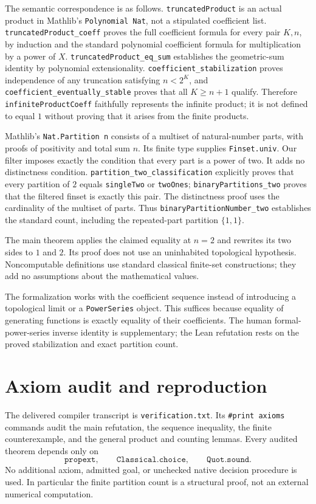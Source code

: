 \documentclass[11pt]{article}
\begin{document}
The semantic correspondence is as follows. \texttt{truncatedProduct} is an actual product in Mathlib's \texttt{Polynomial Nat}, not a stipulated coefficient list. \texttt{truncatedProduct\_coeff} proves the full coefficient formula for every pair $K,n$, by induction and the standard polynomial coefficient formula for multiplication by a power of $X$. \texttt{truncatedProduct\_eq\_sum} establishes the geometric-sum identity by polynomial extensionality. \texttt{coefficient\_stabilization} proves independence of any truncation satisfying $n<2^K$, and \texttt{coefficient\_eventually\_stable} proves that all $K\geq n+1$ qualify. Therefore \texttt{infiniteProductCoeff} faithfully represents the infinite product; it is not defined to equal $1$ without proving that it arises from the finite products.

Mathlib's \texttt{Nat.Partition n} consists of a multiset of natural-number parts, with proofs of positivity and total sum $n$. Its finite type supplies \texttt{Finset.univ}. Our filter imposes exactly the condition that every part is a power of two. It adds no distinctness condition. \texttt{partition\_two\_classification} explicitly proves that every partition of $2$ equals \texttt{singleTwo} or \texttt{twoOnes}; \texttt{binaryPartitions\_two} proves that the filtered finset is exactly this pair. The distinctness proof uses the cardinality of the multiset of parts. Thus \texttt{binaryPartitionNumber\_two} establishes the standard count, including the repeated-part partition $\{1,1\}$.

The main theorem applies the claimed equality at $n=2$ and rewrites its two sides to $1$ and $2$. Its proof does not use an uninhabited topological hypothesis. Noncomputable definitions use standard classical finite-set constructions; they add no assumptions about the mathematical values.

The formalization works with the coefficient sequence instead of introducing a topological limit or a \texttt{PowerSeries} object. This suffices because equality of generating functions is exactly equality of their coefficients. The human formal-power-series inverse identity is supplementary; the Lean refutation rests on the proved stabilization and exact partition count.

\section{Axiom audit and reproduction}
The delivered compiler transcript is \texttt{verification.txt}. Its \texttt{\#print axioms} commands audit the main refutation, the sequence inequality, the finite counterexample, and the general product and counting lemmas. Every audited theorem depends only on
\[
\texttt{propext},\qquad\texttt{Classical.choice},\qquad\texttt{Quot.sound}.
\]
No additional axiom, admitted goal, or unchecked native decision procedure is used. In particular the finite partition count is a structural proof, not an external numerical computation.
\end{document}
